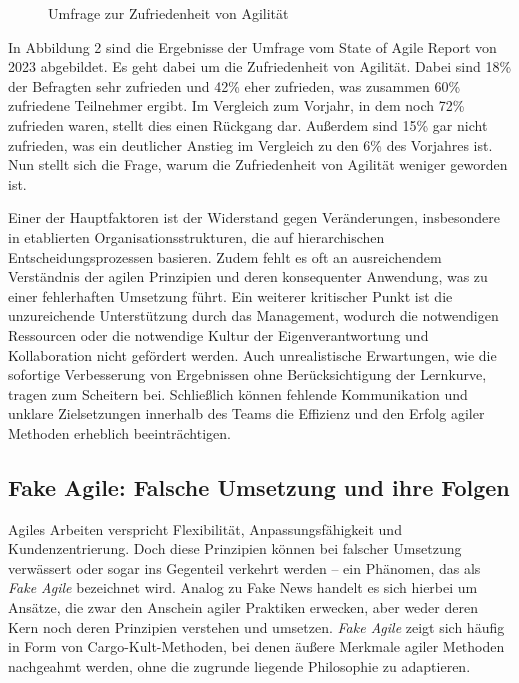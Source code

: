 \documentclass[ngerman]{seminarvorlage}
\begin{document}
\begin{figure}[ht]
    \label{umfrage_}
    \caption{Umfrage zur Zufriedenheit von Agilität}
    \cite{Digital.ai.2023}
\end{figure}

In Abbildung 2 sind die Ergebnisse der Umfrage vom State of Agile Report von 2023 abgebildet. Es geht dabei um die Zufriedenheit von Agilität. Dabei sind 18\% der Befragten sehr zufrieden und 42\% eher zufrieden, was zusammen 60\% zufriedene Teilnehmer ergibt. Im Vergleich zum Vorjahr, in dem noch 72\% zufrieden waren, stellt dies einen Rückgang dar. Außerdem sind 15\% gar nicht zufrieden, was ein deutlicher Anstieg im Vergleich zu den 6\% des Vorjahres ist. Nun stellt sich die Frage, warum die Zufriedenheit von Agilität weniger geworden ist.\cite{Digital.ai.2023}

Einer der Hauptfaktoren ist der Widerstand gegen Veränderungen, insbesondere in etablierten Organisationsstrukturen, die auf hierarchischen Entscheidungsprozessen basieren. 
Zudem fehlt es oft an ausreichendem Verständnis der agilen Prinzipien und deren konsequenter Anwendung, was zu einer fehlerhaften Umsetzung führt. 
Ein weiterer kritischer Punkt ist die unzureichende Unterstützung durch das Management, wodurch die notwendigen Ressourcen oder die notwendige Kultur der Eigenverantwortung und Kollaboration nicht gefördert werden. 
Auch unrealistische Erwartungen, wie die sofortige Verbesserung von Ergebnissen ohne Berücksichtigung der Lernkurve, tragen zum Scheitern bei. Schließlich können fehlende Kommunikation und unklare Zielsetzungen innerhalb des Teams die Effizienz und den Erfolg agiler Methoden erheblich beeinträchtigen.

\subsection{Fake Agile: Falsche Umsetzung und ihre Folgen}

Agiles Arbeiten verspricht Flexibilität, Anpassungsfähigkeit und Kundenzentrierung. Doch diese Prinzipien können bei falscher Umsetzung verwässert oder sogar ins Gegenteil verkehrt werden – ein Phänomen, das als \textit{Fake Agile} bezeichnet wird. Analog zu \glqq Fake News\grqq{} handelt es sich hierbei um Ansätze, die zwar den Anschein agiler Praktiken erwecken, aber weder deren Kern noch deren Prinzipien verstehen und umsetzen. \textit{Fake Agile} zeigt sich häufig in Form von Cargo-Kult-Methoden, bei denen äußere Merkmale agiler Methoden nachgeahmt werden, ohne die zugrunde liegende Philosophie zu adaptieren.
\end{document}
